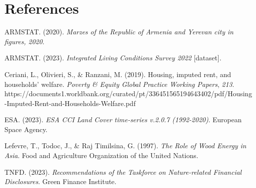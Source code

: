 \documentclass[
  letterpaper,
  DIV=11,
  numbers=noendperiod]{scrartcl}
\begin{document}
\section{References}\label{references}

ARMSTAT. (2020). \emph{Marzes of the Republic of Armenia and Yerevan
city in figures, 2020}.

ARMSTAT. (2023). \emph{Integrated Living Conditions Survey 2022}
{[}dataset{]}.

Ceriani, L., Olivieri, S., \& Ranzani, M. (2019). Housing, imputed rent,
and households' welfare. \emph{Poverty \& Equity Global Practice Working
Papers}, \emph{213}.
https://documents1.worldbank.org/curated/pt/336451565194643402/pdf/Housing-Imputed-Rent-and-Households-Welfare.pdf

ESA. (2023). \emph{ESA CCI Land Cover time-series v.2.0.7 (1992-2020)}.
European Space Agency.

Lefevre, T., Todoc, J., \& Raj Timilsina, G. (1997). \emph{The Role of
Wood Energy in Asia}. Food and Agriculture Organization of the United
Nations.

TNFD. (2023). \emph{Recommendations of the Taskforce on Nature-related
Financial Disclosures}. Green Finance Institute.
\end{document}
